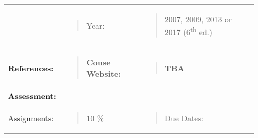 \begin{longtable}[]{@{}lllll@{}}
\begin{minipage}[t]{0.19\columnwidth}
\strut
\end{minipage} & \begin{minipage}[t]{0.19\columnwidth}\raggedright\strut
\begin{quote}
Year:
\end{quote}\strut
\end{minipage} & \begin{minipage}[t]{0.19\columnwidth}\raggedright\strut
\begin{quote}
2007, 2009, 2013 or 2017 (6\textsuperscript{th} ed.)
\end{quote}\strut
\end{minipage}\tabularnewline
\begin{minipage}[t]{0.19\columnwidth}\raggedright\strut
\textbf{References:}\strut
\end{minipage} & \begin{minipage}[t]{0.19\columnwidth}\raggedright\strut
\begin{quote}
\textbf{Couse Website:}
\end{quote}\strut
\end{minipage} & \begin{minipage}[t]{0.19\columnwidth}\raggedright\strut
\begin{quote}
\textbf{TBA}
\end{quote}\strut
\end{minipage} & \begin{minipage}[t]{0.19\columnwidth}\raggedright\strut
\strut
\end{minipage} & \begin{minipage}[t]{0.19\columnwidth}\raggedright\strut
\strut
\end{minipage}\tabularnewline
\textbf{Assessment:} & & & &\tabularnewline
\begin{minipage}[t]{0.19\columnwidth}\raggedright\strut
Assignments:\strut
\end{minipage} & \begin{minipage}[t]{0.19\columnwidth}\raggedright\strut
\begin{quote}
10 \%
\end{quote}\strut
\end{minipage} & \begin{minipage}[t]{0.19\columnwidth}\raggedright\strut
\begin{quote}
Due Dates:
\end{quote}\strut
\end{minipage} & \begin{minipage}[t]{0.19\columnwidth}\raggedright\strut

\end{minipage}
\end{longtable}
